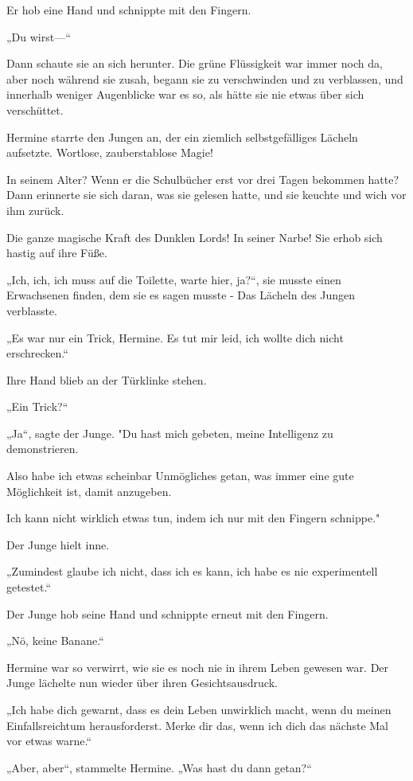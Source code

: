 {Er hob eine Hand und schnippte mit den Fingern.

„Du wirst—“

Dann schaute sie an sich herunter. Die grüne Flüssigkeit war immer noch da, aber noch während sie zusah, begann sie zu verschwinden und zu verblassen, und innerhalb weniger Augenblicke war es so, als hätte sie nie etwas über sich verschüttet.

Hermine starrte den Jungen an, der ein ziemlich selbstgefälliges Lächeln aufsetzte. Wortlose, zauberstablose Magie!

In seinem Alter? Wenn er die Schulbücher erst vor drei Tagen bekommen hatte? Dann erinnerte sie sich daran, was sie gelesen hatte, und sie keuchte und wich vor ihm zurück.

Die ganze magische Kraft des Dunklen Lords! In seiner Narbe! Sie erhob sich hastig auf ihre Füße.

„Ich, ich, ich muss auf die Toilette, warte hier, ja?“, sie musste einen Erwachsenen finden, dem sie es sagen musste - Das Lächeln des Jungen verblasste.

„Es war nur ein Trick, Hermine. Es tut mir leid, ich wollte dich nicht erschrecken.“

Ihre Hand blieb an der Türklinke stehen.

„Ein Trick?“

„Ja“, sagte der Junge. "Du hast mich gebeten, meine Intelligenz zu demonstrieren.

Also habe ich etwas scheinbar Unmögliches getan, was immer eine gute Möglichkeit ist, damit anzugeben.

Ich kann nicht wirklich etwas tun, indem ich nur mit den Fingern schnippe."

Der Junge hielt inne.

„Zumindest glaube ich nicht, dass ich es kann, ich habe es nie experimentell getestet.“

Der Junge hob seine Hand und schnippte erneut mit den Fingern.

„Nö, keine Banane.“

Hermine war so verwirrt, wie sie es noch nie in ihrem Leben gewesen war. Der Junge lächelte nun wieder über ihren Gesichtsausdruck.

„Ich habe dich gewarnt, dass es dein Leben unwirklich macht, wenn du meinen Einfallsreichtum herausforderst. Merke dir das, wenn ich dich das nächste Mal vor etwas warne.“

„Aber, aber“, stammelte Hermine. „Was hast du dann getan?“

}
